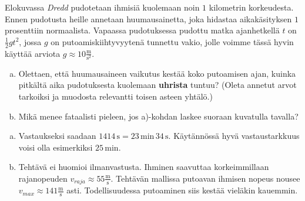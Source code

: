 \begin{tehtava}
    Elokuvassa \emph{Dredd} pudotetaan ihmisiä kuolemaan noin $1$ kilometrin korkeudesta. Ennen pudotusta heille annetaan huumausainetta, joka hidastaa aikakäsityksen $1$ prosenttiin normaalista. Vapaassa pudotuksessa pudottu matka ajanhetkellä $t$ on $\frac{1}{2} gt^2$, jossa $g$ on putoamiskiihtyvyytenä tunnettu vakio, jolle voimme tässä hyvin käyttää arviota $g \approx 10\frac{\text{m}}{\text{s}^2}$.
    \begin{enumerate}[a)]
    \item Olettaen, että huumausaineen vaikutus kestää koko putoamisen ajan, kuinka pitkältä aika pudotuksesta kuolemaan \textbf{uhrista} tuntuu? (Oleta annetut arvot tarkoiksi ja muodosta relevantti toisen asteen yhtälö.)
    \item Mikä menee fataalisti pieleen, jos a)-kohdan laskee suoraan kuvatulla tavalla?
    \end{enumerate}
    \begin{vastaus}
        \begin{enumerate}[a)]
            \item Vastaukseksi saadaan $1414 \, \text{s} = 23 \, \text{min} \, 34 \, \text{s}$. Käytännössä hyvä vastaustarkkuus voisi olla esimerkiksi $25 \, \text{min}$.
            \item Tehtävä ei huomioi ilmanvastusta. Ihminen saavuttaa korkeimmillaan rajanopeuden $v_{raja} \approx 55\frac{\text{m}}{\text{s}}$. Tehtävän mallissa putoavan ihmisen nopeus nousee $v_{max} \approx 141\frac{\text{m}}{\text{s}}$ asti. Todellisuudessa putoaminen siis kestää vieläkin kauemmin.
        \end{enumerate}
    \end{vastaus}
\end{tehtava}
